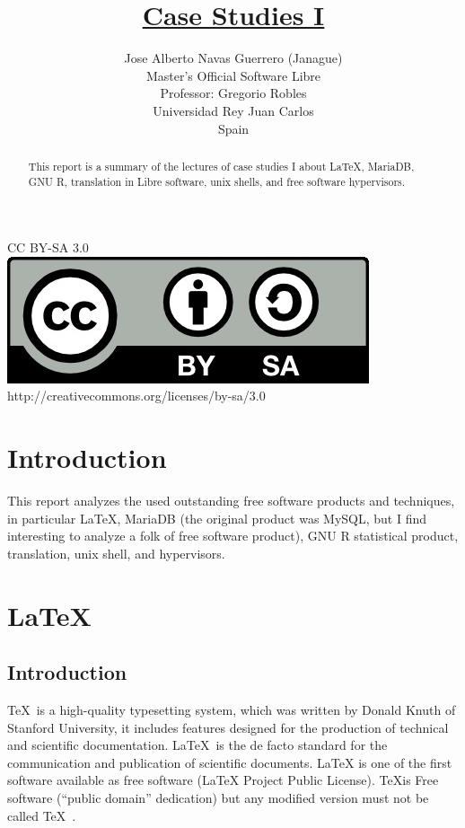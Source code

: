 \documentclass[11pt]{article}
\title{\textbf{\underline{Case Studies I}}}
\author{
        Jose Alberto Navas Guerrero (Janague)\\
       Master's Official Software Libre\\
       Professor: Gregorio Robles\\
	Universidad Rey Juan Carlos\\
        Spain
}
\begin{document}
\maketitle

\begin{abstract}
 This report is a summary of the lectures of case studies I about \LaTeX , MariaDB, GNU R, translation in Libre software, unix shells, and free software hypervisors.  
\end{abstract}


\begin{center}
\textsc CC BY-SA 3.0\\[0.2cm]
\includegraphics[scale=0.5]{img/by-sa} \\ %
{\small http://creativecommons.org/licenses/by-sa/3.0}\\

\end{center}
\newpage

\tableofcontents


\newpage

\section{Introduction}

This report analyzes the used outstanding free software products and techniques, in particular \LaTeX, MariaDB (the original product was MySQL, but I find interesting to analyze a folk of free software product), GNU R statistical product,  translation, unix shell, and hypervisors. 

  


\section{\LaTeX}

\subsection{Introduction}
\TeX\  is a high-quality typesetting system, which was written by Donald Knuth of Stanford University, it includes features designed for the production of technical and scientific documentation. \LaTeX\  is the de facto standard for the communication and publication of scientific documents. LaTeX is one of the first software available as free software (LaTeX Project Public License). \TeX is Free software (“public domain” dedication) but any modified version must not be called \TeX\ .
\end{document}
